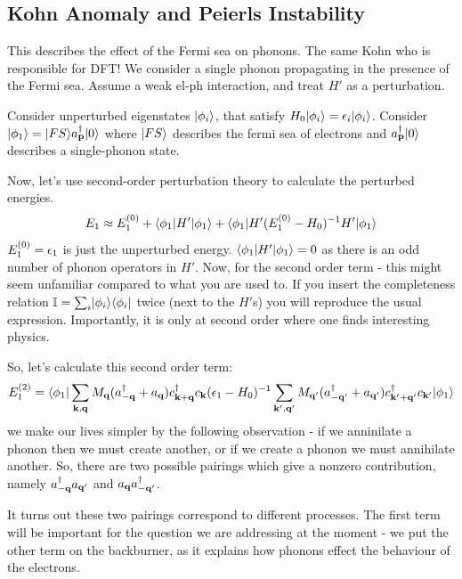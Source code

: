 \subsection{Kohn Anomaly and Peierls Instability}
This describes the effect of the Fermi sea on phonons. The same Kohn who is responsible for DFT! We consider a single phonon propagating in the presence of the Fermi sea.  Assume a weak el-ph interaction, and treat $H'$ as a perturbation.

Consider unperturbed eigenstates $\lvert \phi_i \rangle$, that satisfy $H_0\lvert \phi_i \rangle = \epsilon_i\lvert \phi_i \rangle$. Consider $\lvert \phi_1 \rangle = \lvert FS \rangle a^\dagger_{\mathbf{p}} \lvert 0 \rangle$ where $\lvert FS \rangle$ describes the fermi sea of electrons and $a^\dagger_{\mathbf{p}}\lvert 0 \rangle$ describes a single-phonon state.

Now, let's use second-order perturbation theory to calculate the perturbed energies.
\begin{equation}
    E_1 \approx E_1^{(0)} + \langle \phi_1 \rvert H'\lvert \phi_1 \rangle + \langle \phi_1 \rvert H'(E_1^{(0)} - H_0)^{-1}H'\lvert \phi_1 \rangle
\end{equation}
$E_1^{(0)} = \epsilon_1$ is just the unperturbed energy. $\langle \phi_1 \rvert H'\lvert \phi_1 \rangle = 0$ as there is an odd number of phonon operators in $H'$. Now, for the second order term - this might seem unfamiliar compared to what you are used to. If you insert the completeness relation $\mathbb{I} = \sum_i \lvert \phi_i \rangle \langle \phi_i \rvert$ twice (next to the $H'$s) you will reproduce the usual expression. Importantly, it is only at second order where one finds interesting physics.

So, let's calculate this second order term:
\begin{equation}
    E_1^{(2)} = \langle \phi_1 \rvert\sum_{\mathbf{k}, \mathbf{q}} M_{\mathbf{q}}(a^\dagger_{-\mathbf{q}} + a_{\mathbf{q}})c^\dagger_{\mathbf{k} + \mathbf{q}}c_{\mathbf{k}}(\epsilon_1 - H_0)^{-1}\sum_{\mathbf{k}', \mathbf{q}'} M_{\mathbf{q}'}(a^\dagger_{-\mathbf{q}'} + a_{\mathbf{q}'})c^\dagger_{\mathbf{k}' + \mathbf{q}'}c_{\mathbf{k}'}\lvert \phi_1 \rangle
\end{equation}
we make our lives simpler by the following observation - if we anninilate a phonon then we must create another, or if we create a phonon we must annihilate another. So, there are two possible pairings which give a nonzero contribution, namely $a^\dagger_{-\mathbf{q}}a_{\mathbf{q}'}$ and $a_{\mathbf{q}}a^\dagger_{-\mathbf{q}'}$.

It turns out these two pairings correspond to different processes. The first term will be important for the question we are addressing at the moment - we put the other term on the backburner, as it explains how phonons effect the behaviour of the electrons.

